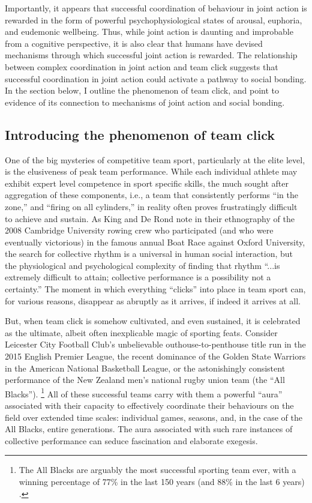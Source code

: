 \begin{CJK}{UTF8}{gbsn}
Importantly, it appears that successful coordination of behaviour in joint action is rewarded in the form of powerful psychophysiological states of arousal, euphoria, and eudemonic wellbeing.  Thus, while joint action is daunting and improbable from a cognitive perspective, it is also clear that humans have devised mechanisms through which successful joint action is rewarded. The relationship between complex coordination in joint action and team click suggests that successful coordination in joint action could activate a pathway to social bonding.  In the section below, I outline the phenomenon of team click, and point to evidence of its connection to mechanisms of joint action and social bonding.


\subsection{Introducing the phenomenon of team click\label{sect:teamClickIntro}}

One of the big mysteries of competitive team sport, particularly at the elite level, is the elusiveness of peak team performance.  While each individual athlete may exhibit expert level competence in sport specific skills, the much sought after aggregation of these components, i.e., a team that consistently performs ``in the zone,'' and ``firing on all cylinders,'' in reality often proves frustratingly difficult to achieve and sustain.  As King and De Rond \textcite[568]{King2011} note in their ethnography of the 2008 Cambridge University rowing crew who participated (and who were eventually victorious) in the famous annual Boat Race against Oxford University, the search for collective rhythm is a universal in human social interaction, but  the physiological and psychological complexity of finding that rhythm ``...is extremely difficult to attain; collective performance is a possibility not a certainty.''   The moment in which everything ``clicks'' into place in team sport can, for various reasons, disappear as abruptly as it arrives, if indeed it arrives at all.

But, when team click is somehow cultivated, and even sustained, it is celebrated as the ultimate, albeit often inexplicable magic of sporting feats. Consider Leicester City Football Club's unbelievable outhouse-to-penthouse title run in the 2015 English Premier League, the recent dominance of the Golden State Warriors in the American National Basketball League, or the astonishingly consistent performance of the New Zealand men's national rugby union team (the ``All Blacks'').
    \footnote{The All Blacks are arguably the most successful sporting team ever, with a winning percentage of 77\% in the last 150 years (and 88\% in the last 6 years) \citep{Kerr2013}.}
All of these successful teams carry with them a powerful ``aura'' associated with their capacity to effectively coordinate their behaviours on the field over extended time scales: individual games, seasons, and, in the case of the All Blacks, entire generations.  The aura associated with such rare instances of collective performance can seduce fascination and elaborate exegesis.


\end{CJK}
